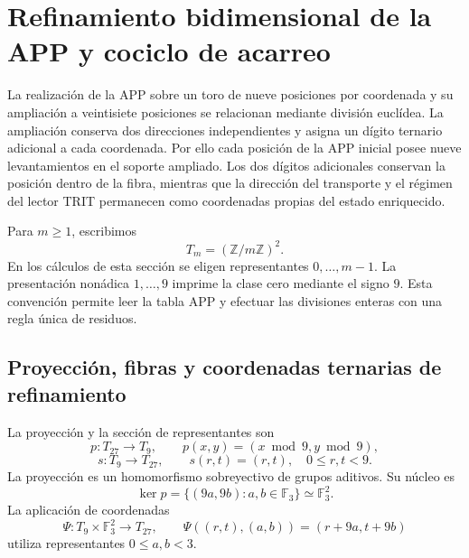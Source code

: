 \section{Refinamiento bidimensional de la APP y cociclo de acarreo}
\label{sec:refinamiento-app-27-9}

La realización de la APP sobre un toro de nueve posiciones por coordenada
y su ampliación a veintisiete posiciones se relacionan mediante división
euclídea. La ampliación conserva dos direcciones independientes y asigna
un dígito ternario adicional a cada coordenada. Por ello cada posición
de la APP inicial posee nueve levantamientos en el soporte ampliado.
Los dos dígitos adicionales conservan la posición dentro de la fibra,
mientras que la dirección del transporte y el régimen del lector TRIT
permanecen como coordenadas propias del estado enriquecido.

Para $m\geq1$, escribimos
\[
 T_m=(\mathbb Z/m\mathbb Z)^2.
\]
En los cálculos de esta sección se eligen representantes
$0,\ldots,m-1$. La presentación nonádica $1,\ldots,9$ imprime la
clase cero mediante el signo $9$. Esta convención permite leer la tabla
APP y efectuar las divisiones enteras con una regla única de residuos.

\subsection{Proyección, fibras y coordenadas ternarias de refinamiento}

La proyección y la sección de representantes son
\[
 p:T_{27}\longrightarrow T_9,\qquad
 p(x,y)=(x\bmod9,y\bmod9),
\]
\[
 s:T_9\longrightarrow T_{27},\qquad s(r,t)=(r,t),
 \quad 0\leq r,t<9.
\]
La proyección es un homomorfismo sobreyectivo de grupos aditivos. Su
núcleo es
\[
 \ker p=\{(9a,9b):a,b\in\mathbb F_3\}
        \simeq\mathbb F_3^2.
\]
La aplicación de coordenadas
\begin{equation}
 \Psi:T_9\times\mathbb F_3^2\longrightarrow T_{27},\qquad
 \Psi((r,t),(a,b))=(r+9a,t+9b)
 \label{eq:app-refinamiento-coordenadas}
\end{equation}
utiliza representantes $0\leq a,b<3$.

